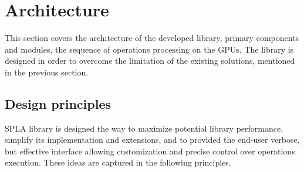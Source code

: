 \section{Architecture}

This section covers the architecture of the developed library, primary components and modules, the sequence of operations processing on the GPUs. The library is designed in order to overcome the limitation of the existing solutions, mentioned in the previous section.

\subsection{Design principles}

SPLA library is designed the way to maximize potential library performance, simplify its implementation and extensions, and to provided the end-user verbose, but effective interface allowing customization and precise control over operations execution. These ideas are captured in the following principles.


